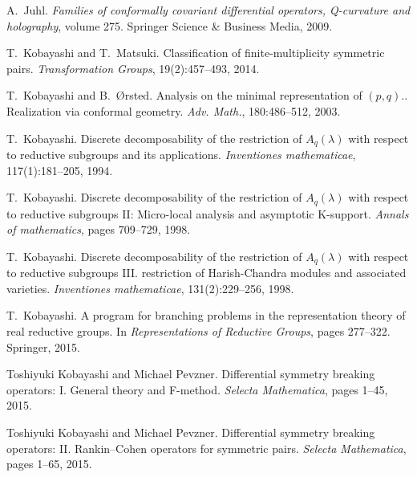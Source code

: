 \documentclass{article}
\newcommand{\tmtextit}[1]{{\itshape{#1}}}
\newcommand{\tmtextrm}[1]{{\rmfamily{#1}}}
\numberwithin{definition}{section}
\numberwithin{lemma}{section}
\numberwithin{proposition}{section}
{\theorembodyfont{\rmfamily}\newtheorem{remark}{Remark}
\numberwithin{remark}{section}
}
\begin{document}
\begin{thebibliography}{CK{\O}P11}
  A.~Juhl. {\newblock}\tmtextit{Families of
  conformally covariant differential operators, Q-curvature and holography},
  volume 275. {\newblock}Springer Science \& Business Media, 2009.
  
  T.~Kobayashi and T.~Matsuki.
  {\newblock}Classification of finite-multiplicity symmetric pairs.
  {\newblock}\tmtextit{Transformation Groups}, 19(2):457--493, 2014.
  
  T.~Kobayashi and B.~{\O}rsted. {\newblock}Analysis on
  the minimal representation of \tmtextrm{O}$(p, q)$.\tmtextrm{I}. Realization
  via conformal geometry. {\newblock}\tmtextit{Adv. Math.}, 180:486--512,
  2003.
  
  T.~Kobayashi. {\newblock}Discrete
  decomposability of the restriction of $A_q (\lambda)$ with respect to
  reductive subgroups and its applications. {\newblock}\tmtextit{Inventiones
  mathematicae}, 117(1):181--205, 1994.
  
  T.~Kobayashi. {\newblock}Discrete
  decomposability of the restriction of $A_q (\lambda)$ with respect to
  reductive subgroups II: Micro-local analysis and asymptotic K-support.
  {\newblock}\tmtextit{Annals of mathematics}, pages 709--729, 1998.
  
  T.~Kobayashi. {\newblock}Discrete
  decomposability of the restriction of $A_q (\lambda)$ with respect to
  reductive subgroups III. restriction of Harish-Chandra modules and
  associated varieties. {\newblock}\tmtextit{Inventiones mathematicae},
  131(2):229--256, 1998.
  
  T.~Kobayashi. {\newblock}A program for
  branching problems in the representation theory of real reductive groups.
  {\newblock}In \tmtextit{Representations of Reductive Groups}, pages
  277--322. Springer, 2015.
  
  Toshiyuki Kobayashi and Michael
  Pevzner. {\newblock}Differential symmetry breaking operators: I. General
  theory and F-method. {\newblock}\tmtextit{Selecta Mathematica}, pages 1--45,
  2015.
  
  Toshiyuki Kobayashi and Michael
  Pevzner. {\newblock}Differential symmetry breaking operators: II.
  Rankin--Cohen operators for symmetric pairs. {\newblock}\tmtextit{Selecta
  Mathematica}, pages 1--65, 2015.
  

\end{thebibliography}
\end{document}
